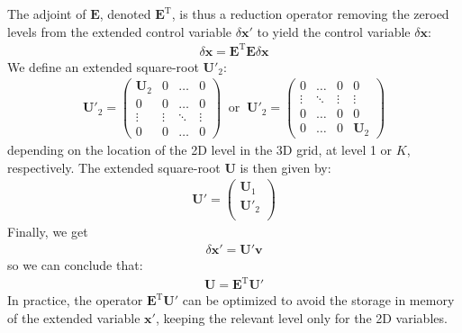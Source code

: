 \documentclass[12pt]{scrartcl}
\begin{document}
The adjoint of $\mathbf{E}$, denoted $\mathbf{E}^\mathrm{T}$, is thus a reduction operator removing the zeroed levels from the extended control variable $\delta \mathbf{x}'$ to yield the control variable $\delta \mathbf{x}$:
\begin{align}
\delta \mathbf{x} = \mathbf{E}^\mathrm{T} \mathbf{E} \delta \mathbf{x}
\end{align}
We define an extended square-root $\mathbf{U}'_2$:
\begin{align}
\mathbf{U}'_2 = \left( \begin{array}{cccc}
\mathbf{U}_2 & 0 & \dots & 0 \\[1ex]
0 & 0 & \dots & 0 \\
\vdots & \vdots & \ddots & \vdots \\
0 & 0 & \dots & 0
\end{array} \right) \ \text{ or } \ \mathbf{U}'_2 = \left( \begin{array}{cccc}
0 & \dots & 0 & 0\\
\vdots & \ddots & \vdots & \vdots\\
0 & \dots & 0 & 0 \\
0 & \dots & 0 & \mathbf{U}_2
\end{array} \right)
\end{align}
depending on the location of the 2D level in the 3D grid, at level 1 or $K$, respectively. The extended square-root $\mathbf{U}$ is then given by:
\begin{align}
\mathbf{U}' = \left( \begin{array}{c}
\mathbf{U}_1 \\[1ex]
\hline
\mathbf{U}'_2 \\[1ex]
\end{array} \right)
\end{align}
Finally, we get
\begin{align}
\delta \mathbf{x}' = \mathbf{U}' \mathbf{v}
\end{align}
so we can conclude that:
\begin{align}
\mathbf{U} = \mathbf{E}^\mathrm{T} \mathbf{U}'
\end{align}
In practice, the operator $\mathbf{E}^\mathrm{T} \mathbf{U}'$ can be optimized to avoid the storage in memory of the extended variable $\mathbf{x}'$, keeping  the relevant level only for the 2D variables.



\end{document}

